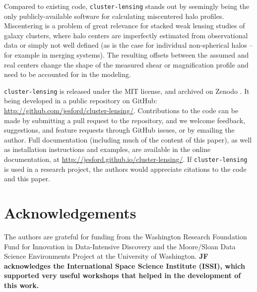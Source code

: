 \documentclass[twocolumn]{aastex6}
\newcommand{\code}{\lstinline[style=codeintext]}
\begin{document}
Compared to existing code, \code{cluster-lensing} stands out by seemingly being the only publicly-available software for calculating miscentered halo profiles. Miscentering is a problem of great relevance for stacked weak lensing studies of galaxy clusters, where halo centers are imperfectly estimated from observational data or simply not well defined (as is the case for individual non-spherical halos -- for example in merging systems). The resulting offsets between the assumed and real centers change the shape of the measured shear or magnification profile and need to be accounted for in the modeling.

\code{cluster-lensing} is released under the MIT license, and archived on Zenodo \citep{clusterlensing}. It being developed in a public repository on GitHub: \url{http://github.com/jesford/cluster-lensing/}. Contributions to the code can be made by submitting a pull request to the repository, and we welcome feedback, suggestions, and feature requests through GitHub issues, or by emailing the author. Full documentation (including much of the content of this paper), as well as installation instructions and examples, are available in the online documentation, at \url{http://jesford.github.io/cluster-lensing/}. If \code{cluster-lensing} is used in a research project, the authors would appreciate citations to the code \citep[i.e.][]{clusterlensing} and this paper.



\section*{Acknowledgements}
The authors are grateful for funding from the Washington Research Foundation Fund for Innovation in Data-Intensive Discovery and the Moore/Sloan Data Science Environments Project at the University of Washington. {\bf JF acknowledges the International Space Science Institute (ISSI), which supported very useful workshops that helped in the development of this work.}




\end{document}
